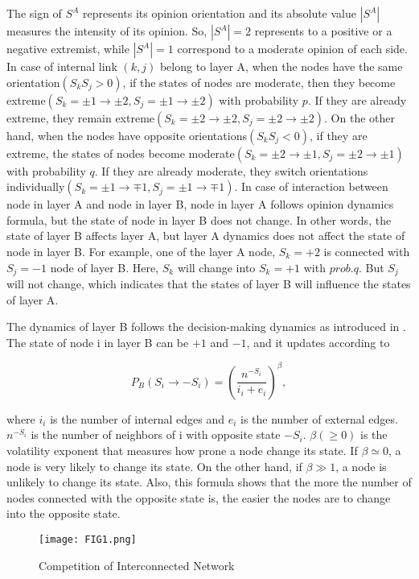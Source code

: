 \documentclass[review]{elsarticle}
\begin{document}
The sign of $S^A$ represents its opinion orientation and its absolute value $|S^A|$ measures the intensity of its opinion. So, $|S^A|=2$ represents to a positive or a negative extremist, while  $|S^A|=1$ correspond to a moderate opinion of each side. In case of internal link $(k, j)$ belong to layer A, when the nodes have the same orientation$(S_kS_j>0)$, if the states of nodes are moderate, then they become extreme$(S_k=\pm1 \rightarrow \pm2, S_j= \pm1 \rightarrow \pm2)$ with probability $p$. If they are already extreme, they remain extreme$(S_k=\pm2 \rightarrow \pm2, S_j= \pm2 \rightarrow \pm2)$. On the other hand, when the nodes have opposite orientations$(S_kS_j<0)$, if they are extreme, the states of nodes become moderate$(S_k=\pm2 \rightarrow \pm1, S_j= \pm2 \rightarrow \pm1)$ with probability $q$. If they are already moderate, they switch orientations individually$(S_k=\pm1 \rightarrow \mp1, S_j= \pm1 \rightarrow \mp1)$.  In case of interaction between node in layer A and node in layer B, node in layer A follows opinion dynamics formula, but the state of node in layer B does not change. In other words, the state of layer B affects layer A, but layer A dynamics does not affect the state of node in layer B. For example, one of the layer A node, $S_k = +2$ is connected with  $S_j = -1$ node of layer B. Here, $S_k$ will change into $S_k = +1$ with $prob.q$. But $S_j$ will not change, which indicates that the states of layer B will influence the states of layer A.

The dynamics of layer B follows the decision-making dynamics as introduced in \cite{abrams2003, vazquez2010}. The state of node i in layer B can be $+1$ and $-1$, and it updates according to

\begin{equation}
{P_B}({S_i} \rightarrow - {S_i}) = {\left( {\frac{{{n^{ - {S_i}}}}}{{{i_i} + {e_i}}}} \right)^\beta },
\end{equation}

where $i_i$ is the number of internal edges and $e_i$ is the number of external edges. $n^{-S_i}$ is the number of neighbors of i with opposite state $-S_i$. $\beta(\geq 0)$ is the volatility exponent that measures how prone a node change its state. If $\beta \simeq 0$, a node is very likely to change its state. On the other hand, if $\beta \gg 1$, a node is unlikely to change its state. Also, this formula shows that the more the number of nodes connected with the opposite state is, the easier the nodes are to change into the opposite state.\\
\begin{figure}[!htb]
	\centering
	\texttt{[image: FIG1.png]}
	\caption{Competition of Interconnected Network}
	\label{Fig1}
\end{figure}
\end{document}
